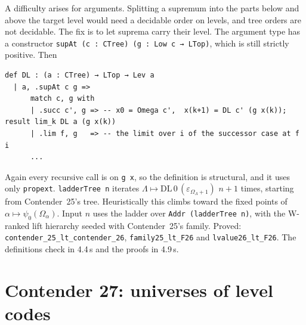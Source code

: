 \documentclass[11pt]{article}
\theoremstyle{definition}
\theoremstyle{remark}
\newcommand{\lean}[1]{\texttt{#1}}
\begin{document}
A difficulty arises for arguments. Splitting a supremum into the parts below
and above the target level would need a decidable order on levels, and tree
orders are not decidable. The fix is to let suprema carry their level. The
argument type has a constructor \lean{supAt (c : CTree) (g : Low c → LTop)},
which is still strictly positive. Then
\begin{lstlisting}
def DL : (a : CTree) → LTop → Lev a
  | a, .supAt c g =>
      match c, g with
      | .succ c', g => -- x0 = Omega c',  x(k+1) = DL c' (g x(k));  result lim_k DL a (g x(k))
      | .lim f, g   => -- the limit over i of the successor case at f i
      ...
\end{lstlisting}
Again every recursive call is on \lean{g x}, so the definition is structural,
and it uses only \lean{propext}. \lean{ladderTree n} iterates
$\Lambda\mapsto \mathrm{DL}\,0\,(\varepsilon_{\Omega_\Lambda+1})$ $n{+}1$ times,
starting from Contender~25's tree. Heuristically this climbs toward the fixed
points of $\alpha\mapsto\psi_0(\Omega_\alpha)$. Input $n$ uses the ladder over
\lean{Addr (ladderTree n)}, with the W-ranked lift hierarchy seeded with
Contender~25's family. Proved: \lean{contender\_25\_lt\_\allowbreak contender\_26},
\lean{family25\_lt\_F26} and \lean{lvalue26\_lt\_F26}. The definitions check in
4.4\,s and the proofs in 4.9\,s.

\section{Contender 27: universes of level codes}
\end{document}
